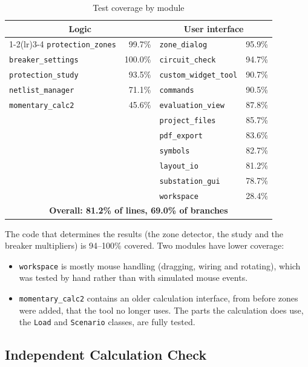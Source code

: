 \begin{table}[H]
  \centering
  \caption{Test coverage by module}
  \label{tab:coverage}
  \small
  \begin{tabular}{l r l r}
    \toprule
    \multicolumn{2}{c}{\textbf{Logic}} & \multicolumn{2}{c}{\textbf{User interface}} \\
    \cmidrule(lr){1-2}\cmidrule(lr){3-4}
    \texttt{protection\_zones} & 99.7\% & \texttt{zone\_dialog} & 95.9\% \\
    \texttt{breaker\_settings} & 100.0\% & \texttt{circuit\_check} & 94.7\% \\
    \texttt{protection\_study} & 93.5\% & \texttt{custom\_widget\_tool} & 90.7\% \\
    \texttt{netlist\_manager} & 71.1\% & \texttt{commands} & 90.5\% \\
    \texttt{momentary\_calc2} & 45.6\% & \texttt{evaluation\_view} & 87.8\% \\
    & & \texttt{project\_files} & 85.7\% \\
    & & \texttt{pdf\_export} & 83.6\% \\
    & & \texttt{symbols} & 82.7\% \\
    & & \texttt{layout\_io} & 81.2\% \\
    & & \texttt{substation\_gui} & 78.7\% \\
    & & \texttt{workspace} & 28.4\% \\
    \midrule
    \multicolumn{4}{c}{\textbf{Overall: 81.2\% of lines, 69.0\% of branches}} \\
    \bottomrule
  \end{tabular}
\end{table}

The code that determines the results (the zone detector, the study and the breaker
multipliers) is 94--100\% covered. Two modules have lower coverage:
\begin{itemize}
  \item \texttt{workspace} is mostly mouse handling (dragging, wiring and rotating),
        which was tested by hand rather than with simulated mouse events.
  \item \texttt{momentary\_calc2} contains an older calculation interface, from before
        zones were added, that the tool no longer uses. The parts the calculation does
        use, the \texttt{Load} and \texttt{Scenario} classes, are fully tested.
\end{itemize}

\subsection{Independent Calculation Check}

